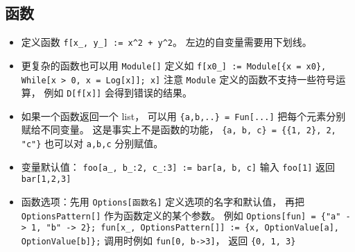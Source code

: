 \subsection{函数}
\begin{itemize}
\item 定义函数 \verb|f[x_, y_] := x^2 + y^2|。 左边的自变量需要用下划线。
\item 更复杂的函数也可以用 \verb|Module[]| 定义如 \verb|f[x0_] := Module[{x = x0}, While[x > 0, x = Log[x]]; x]| 注意 \verb|Module| 定义的函数不支持一些符号运算， 例如 \verb|D[f[x]]| 会得到错误的结果。
\item 如果一个函数返回一个 list， 可以用 \verb|{a,b,..} = Fun[...]| 把每个元素分别赋给不同变量。 这是事实上不是函数的功能， \verb|{a, b, c} = {{1, 2}, 2, "c"}| 也可以对 \verb|a,b,c| 分别赋值。
\item 变量默认值： \verb|foo[a_, b_:2, c_:3] := bar[a, b, c]| 输入 \verb|foo[1]| 返回 \verb|bar[1,2,3]|
\item 函数选项：先用 \verb|Options[函数名]| 定义选项的名字和默认值， 再把 \verb|OptionsPattern[]| 作为函数定义的某个参数。 例如 \verb|Options[fun] = {"a" -> 1, "b" -> 2}; fun[x_, OptionsPattern[]] := {x, OptionValue[a], OptionValue[b]};| 调用时例如 \verb|fun[0, b->3]|， 返回 \verb|{0, 1, 3}|
\end{itemize}

